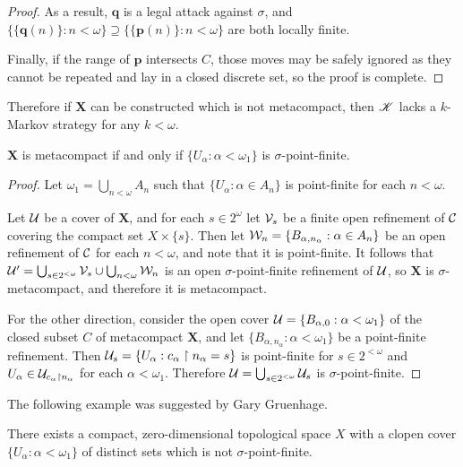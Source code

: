 \begin{proof}
  As a result, $\pmb q$ is a legal attack against $\sigma$, and
  $\{\{\pmb q(n)\}:n<\omega\}\supseteq\{\{\pmb p(n)\}:n<\omega\}$ are
  both locally finite.

  Finally, if the range of $\pmb p$ intersects $C$, those moves may be safely
  ignored as they cannot be repeated and lay in a closed discrete set,
  so the proof is complete.
\end{proof}

Therefore if $\pmb X$ can be constructed which is not metacompact, then
$\mathscr{K}$ lacks a $k$-Markov strategy for any $k<\omega$.

\begin{thm}
  $\pmb X$ is metacompact
    if and only if
  $\{U_\alpha:\alpha<\omega_1\}$ is $\sigma$-point-finite.
\end{thm}

\begin{proof}
  Let $\omega_1=\bigcup_{n<\omega}A_n$ such that
  $\{U_\alpha:\alpha\in A_n\}$ is point-finite for each $n<\omega$.

  Let $\mathcal{U}$ be a cover of $\pmb X$, and for each $s\in 2^\omega$
  let $\mathcal{V}_s$ be a finite open refinement of $\mathcal{C}$ covering the compact
  set $X\times\{s\}$. Then let $\mathcal{W}_n = \{B_{\alpha,n_\alpha}:\alpha\in A_n\}$
  be an open refinement of $\mathcal{C}$ for each $n<\omega$, and note that it
  is point-finite. It follows that
  $\mathcal{U}' = \bigcup_{s\in 2^{<\omega}} \mathcal{V}_s \cup \bigcup_{n<\omega} \mathcal{W}_n$
  is an open $\sigma$-point-finite refinement of $\mathcal{U}$, so $\pmb X$
  is $\sigma$-metacompact, and therefore it is metacompact.

  For the other direction, consider the open cover
  $\mathcal{U} = \{B_{\alpha,0}:\alpha<\omega_1\}$ of the closed subset $C$ of
  metacompact $\pmb X$, and let $\{B_{\alpha,n_\alpha}:\alpha<\omega_1\}$ be
  a point-finite refinement. Then
  $\mathcal{U}_s = \{ U_\alpha : c_\alpha \restriction n_\alpha = s\}$ is
  point-finite for $s\in 2^{<\omega}$ and
  $U_\alpha\in\mathcal{U}_{c_\alpha\restriction n_\alpha}$ for each $\alpha<\omega_1$.
  Therefore $\mathcal{U} = \bigcup_{s\in 2^{<\omega}} \mathcal{U}_s$ is
  $\sigma$-point-finite.
\end{proof}

The following example was suggested by Gary Gruenhage.

\begin{thm}
  There exists a compact, zero-dimensional topological space $X$
  with a clopen cover $\{U_\alpha : \alpha<\omega_1\}$ of distinct
  sets which is not $\sigma$-point-finite.
\end{thm}

